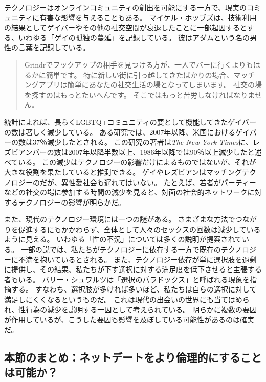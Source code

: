 \documentclass[paper=a4,book,openany]{jlreq} \usepackage{mystyle}
\begin{document}
テクノロジーはオンラインコミュニティの創出を可能にする一方で、現実のコミュニティに有害な影響を与えることもある。
マイケル・ホッブズは、技術利用の結果としてゲイバーやその他の社交空間が衰退したことに一部起因するとする、いわゆる「ゲイの孤独の蔓延」を記録している。
彼はアダムという名の男性の言葉を記録している。
\begin{quote}
  Grindrでフックアップの相手を見つける方が、一人でバーに行くよりもはるかに簡単です。
特に新しい街に引っ越してきたばかりの場合、マッチングアプリは簡単にあなたの社交生活の場となってしまいます。
社交の場を探すのはもっとたいへんです。
そこではもっと苦労しなければなりません。
\citep{hobbes17:_toget_alone}
\end{quote}

統計によれば、長らくLGBTQ+コミュニティの要として機能してきたゲイバーの数は著しく減少している。
ある研究では、2007年以降、米国におけるゲイバーの数は37％減少したとされる\citep{mattson19:_are_gay_bars_closin}。
この研究の著者は\emph{The New York Times}に、レズビアンバーの数は2007年以降半数以上、1986年以降では90％以上減少したと述べている\citep{wilson20:_where_did_all_lesbian_bars_go}。
この減少はテクノロジーの影響だけによるものではないが、それが大きな役割を果たしていると推測できる。
ゲイやレズビアンはマッチングテクノロジーのだが、異性愛社会も遅れてはいない。
たとえば、若者がパーティーなどの社交の場に参加する時間の減少を見ると、対面の社会的ネットワークに対するテクノロジーの影響が明らかだ\citep{wayne15:_death_party}。

また、現代のテクノロジー環境には一つの謎がある。
さまざまな方法でつながりを促進するにもかかわらず、全体として人々のセックスの回数は減少しているように見える。
いわゆる「性の不況」については多くの説明が提案されている\citep{julian18:_why_are_young_peopl_havin}。
一部の説では、私たちがテクノロジーに依存する一方で既存のテクノロジーに不満を抱いているとされる。
また、テクノロジー依存が単に選択肢を過剰に提供し、その結果、私たちが下す選択に対する満足度を低下させると主張する者もいる。
バリー・シュワルツは「選択のパラドックス」と呼ばれる現象を指摘する。
すなわち、選択肢が多ければ多いほど、私たちは自らの選択に対して満足しにくくなるというものだ。
これは現代の出会いの世界にも当てはめられ、性行為の減少を説明する一因として考えられている\citep{svoboda16:_probl_moder_roman_is_too_much_choic}。
明らかに複数の要因が作用しているが、こうした要因も影響を及ぼしている可能性があるのは確実だ。

\subsection{本節のまとめ：ネットデートをより倫理的にすることは可能か？}
\end{document}
